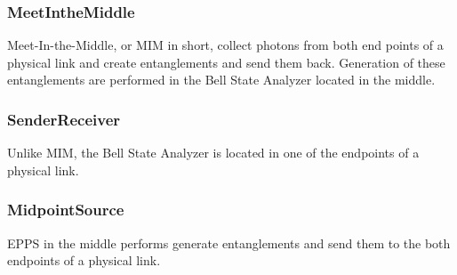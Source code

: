 \subsubsection{MeetIntheMiddle}

Meet-In-the-Middle, or MIM in short, collect photons from both end points of a physical link and create entanglements and send them back. Generation of these entanglements are performed in the Bell State Analyzer located in the middle.

\subsubsection{SenderReceiver}

Unlike MIM, the Bell State Analyzer is located in one of the endpoints of a physical link.

\subsubsection{MidpointSource}

EPPS in the middle performs generate entanglements and send them to the both endpoints of a physical link.


